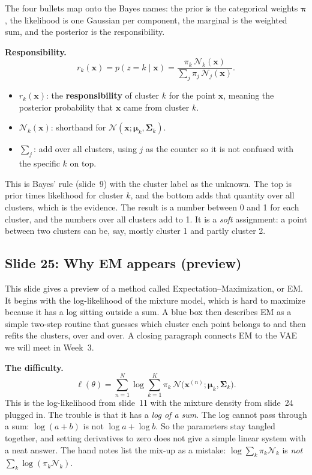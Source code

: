 The four bullets map onto the Bayes names: the prior is the categorical weights $\boldsymbol\pi$, the likelihood is one Gaussian per component, the marginal is the weighted sum, and the posterior is the responsibility.

\textbf{Responsibility.}
\[
r_k(\mathbf{x})=p(z=k\mid\mathbf{x})=\frac{\pi_k\,\mathcal{N}_k(\mathbf{x})}{\sum_{j}\pi_j\,\mathcal{N}_j(\mathbf{x})}.
\]
\begin{itemize}
\item $r_k(\mathbf{x})$: the \textbf{responsibility} of cluster $k$ for the point $\mathbf{x}$, meaning the posterior probability that $\mathbf{x}$ came from cluster $k$.
\item $\mathcal{N}_k(\mathbf{x})$: shorthand for $\mathcal{N}(\mathbf{x};\boldsymbol{\mu}_k,\boldsymbol{\Sigma}_k)$.
\item $\sum_j$: add over all clusters, using $j$ as the counter so it is not confused with the specific $k$ on top.
\end{itemize}
This is Bayes' rule (slide~9) with the cluster label as the unknown. The top is prior times likelihood for cluster $k$, and the bottom adds that quantity over all clusters, which is the evidence. The result is a number between 0 and 1 for each cluster, and the numbers over all clusters add to 1. It is a \textit{soft} assignment: a point between two clusters can be, say, mostly cluster 1 and partly cluster 2.

\subsection*{Slide 25: Why EM appears (preview)}

This slide gives a preview of a method called Expectation--Maximization, or EM. It begins with the log-likelihood of the mixture model, which is hard to maximize because it has a log sitting outside a sum. A blue box then describes EM as a simple two-step routine that guesses which cluster each point belongs to and then refits the clusters, over and over. A closing paragraph connects EM to the VAE we will meet in Week~3.

\textbf{The difficulty.}
\[
\ell(\theta)=\sum_{n=1}^{N}\log\sum_{k=1}^{K}\pi_k\,\mathcal{N}\big(\mathbf{x}^{(n)};\boldsymbol{\mu}_k,\boldsymbol{\Sigma}_k\big).
\]
This is the log-likelihood from slide~11 with the mixture density from slide~24 plugged in. The trouble is that it has a \textit{log of a sum}. The log cannot pass through a sum: $\log(a+b)$ is not $\log a+\log b$. So the parameters stay tangled together, and setting derivatives to zero does not give a simple linear system with a neat answer. The hand notes list the mix-up as a mistake: $\log\sum_k\pi_k\mathcal{N}_k$ is \textit{not} $\sum_k\log(\pi_k\mathcal{N}_k)$.

